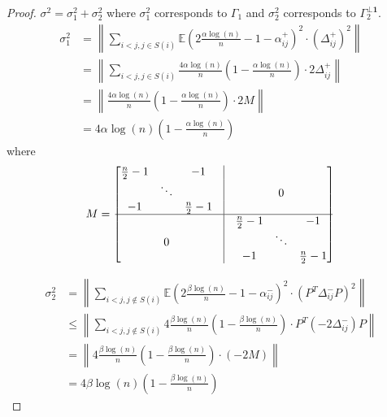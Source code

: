 \documentclass[english]{article}
\newcommand{\1}{\textbf{1}}
\newcommand{\A}{\frac{\alpha \log(n)}{n}}
\newcommand{\B}{\frac{\beta \log(n)}{n}}
\newcommand{\E}{\mathbb{E}}
\begin{document}
\begin{proof}
$\sigma^2=\sigma_1^2+\sigma_2^2$ where $\sigma_1^2$ corresponds to $\Gamma_1$ and $\sigma_2^2$ corresponds to $\Gamma_2^{\perp \1}$.\\
\begin{align}
\sigma_1^2 &=\left\| \sum_{i<j, j \in S(i)}\E\left(2\A-1 - \alpha^{+}_{ij}\right)^2 \cdot (\Delta^+_{ij})^2  \right\| \\
&=\left\| \sum_{i<j, j \in S(i)}\frac{4\alpha \log(n)}{n}\left(1-\frac{\alpha \log(n)}{n}\right) \cdot 2\Delta^+_{ij} \right\| \\
&= \left\| \frac{4\alpha \log(n)}{n}\left(1-\frac{\alpha \log(n)}{n}\right) \cdot 2M  \right\| \\
&= 4\alpha\log(n)\left(1-\frac{\alpha \log(n)}{n} \right)
\end{align}
where
\begin{equation*}
 M=\begin{bmatrix} \frac{n}{2}-1 & \text{ } & -1 & \vrule & \text{ } & \text{ }  & \text{ } \\
\text{ } & \ddots & \text{ } & \vrule & \text{ }& 0 & \text{ } \\
-1 & \text{ } & \frac{n}{2}-1 & \vrule & \text{ } & \text{ } & \text{ } \\ \hline
 \text{ } & \text{ }  & \text{ } & \vrule & \frac{n}{2}-1 & \text{ } & -1  \\
 \text{ }& 0 & \text{ }  & \vrule & \text{ } & \ddots & \text{ } \\
\text{ } & \text{ } & \text{ }& \vrule & -1 & \text{ } & \frac{n}{2}-1\\
\end{bmatrix}\\
\end{equation*}

\begin{align}
\sigma_2^2 &= \left\| \sum_{i<j, j \notin S(i)}\E\left(2\B-1 - \alpha^{-}_{ij}\right)^2 \cdot \left(P^T \Delta^-_{ij} P\right)^2 \right\| \\
& \leq  \left\| \sum_{i<j, j \notin S(i)} 4\B\left(1-\B\right) \cdot P^T \left(-2\Delta^-_{ij}\right) P \right\| \\
&=  \left\| 4\B\left(1-\B\right) \cdot (-2M)\right\| \\
&= 4\beta \log(n) \left(1-\B \right)
\end{align}


\end{proof}
\end{document}
